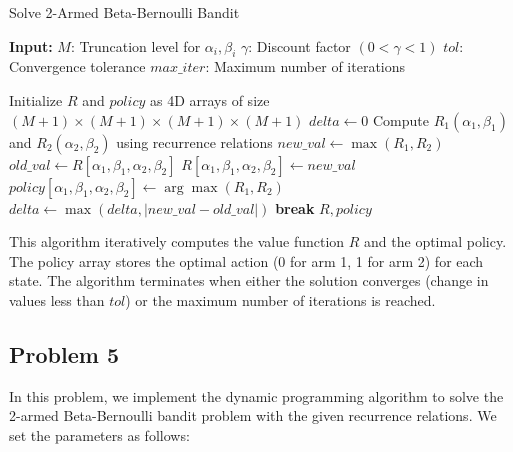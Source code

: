 \documentclass[11pt]{article}
\begin{document}
\begin{algorithm}[H]
\caption{Solve 2-Armed Beta-Bernoulli Bandit}
\begin{algorithmic}[1]
    \State \textbf{Input:}
    \State \hspace{\algorithmicindent} $M$: Truncation level for $\alpha_i, \beta_i$
    \State \hspace{\algorithmicindent} $\gamma$: Discount factor $(0 < \gamma < 1)$
    \State \hspace{\algorithmicindent} $tol$: Convergence tolerance
    \State \hspace{\algorithmicindent} $max\_iter$: Maximum number of iterations
    
    \State Initialize $R$ and $policy$ as 4D arrays of size $(M+1) \times (M+1) \times (M+1) \times (M+1)$
        \State $delta \gets 0$ 
                        \State Compute $R_1(\alpha_1, \beta_1)$ and $R_2(\alpha_2, \beta_2)$ using recurrence relations
                        \State $new\_val \gets \max(R_1, R_2)$
                        \State $old\_val \gets R[\alpha_1, \beta_1, \alpha_2, \beta_2]$
                        \State $R[\alpha_1, \beta_1, \alpha_2, \beta_2] \gets new\_val$
                        \State $policy[\alpha_1, \beta_1, \alpha_2, \beta_2] \gets \arg \max(R_1, R_2)$
                        \State $delta \gets \max(delta, |new\_val - old\_val|)$
                    \EndFor
                \EndFor
            \EndFor
        \EndFor
            \State \textbf{break} 
        \EndIf
    \EndFor
    \State \Return $R, policy$
\EndProcedure
\end{algorithmic}
\end{algorithm}

This algorithm iteratively computes the value function $R$ and the optimal policy. The policy array stores the optimal action (0 for arm 1, 1 for arm 2) for each state. The algorithm terminates when either the solution converges (change in values less than $tol$) or the maximum number of iterations is reached.

\newpage
\subsection{Problem 5}
In this problem, we implement the dynamic programming algorithm to solve the 2-armed Beta-Bernoulli bandit problem with the given recurrence relations. We set the parameters as follows:
\end{document}
